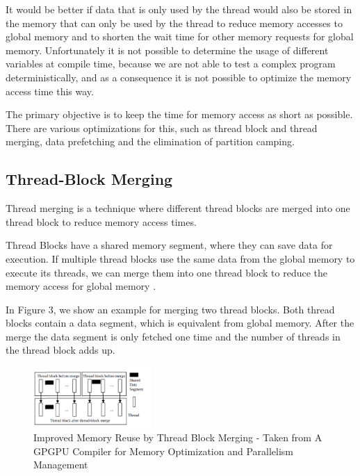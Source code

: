 \documentclass[conference]{IEEEtran}
\begin{document}
	It would be better if data that is only used by the thread would also be stored in the memory that can only be used by the thread to reduce memory accesses to global memory and to shorten the wait time for other memory requests for global memory.
	Unfortunately it is not possible to determine the usage of different variables at compile time, because we are not able to test a complex program deterministically, and as a consequence it is not possible to optimize the memory access time this way.

	The primary objective is to keep the time for memory access as short as possible. There are various optimizations for this, such as thread block and thread merging, data prefetching and the elimination of partition camping.
	

	
	\subsection{Thread-Block Merging}
	
	
	Thread merging is a technique where different thread blocks are merged into one thread block to reduce memory access times.
	
	
	Thread Blocks have a shared memory segment, where they can save data for execution. If multiple thread blocks use the same data from the global memory to execute its threads, we can merge them into one thread block to reduce the memory access for global memory \cite{yang2010gpgpu}.
	
	
	In Figure 3, we show an example for merging two thread blocks. Both thread blocks contain a data segment, which is equivalent from global memory. After the merge the data segment is only fetched one time and the number of threads in the thread block adds up.
	
	\begin{figure}[htbp]
		\centerline{\includegraphics[width=0.4\textwidth]{ThreadBlockMerge.png}}
		\caption{Improved Memory Reuse by Thread Block Merging - Taken from A GPGPU Compiler for Memory Optimization and Parallelism Management}
		\label{fig3}
	\end{figure}
	
\end{document}
